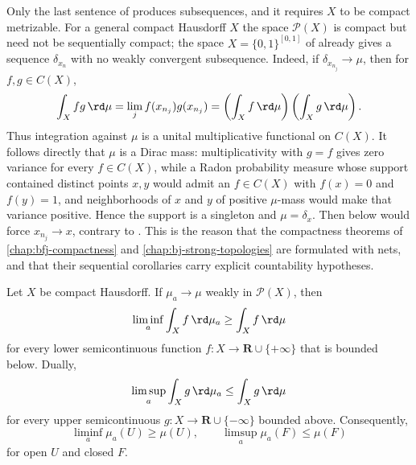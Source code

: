 \begin{remark}
\label{rem:weak-metrizability}
Only the last sentence of  produces
subsequences, and it requires $X$ to be compact metrizable.  For a general
compact Hausdorff $X$ the space $\mathcal P(X)$ is compact but need not be
sequentially compact; the space $X=\{0,1\}^{[0,1]}$ of
 already gives a sequence $\delta_{x_n}$ with no
weakly convergent subsequence.  Indeed, if
$\delta_{x_{n_j}}\to\mu$, then for $f,g\in C(X)$,
\[
 \int_Xfg\,\rd\mu
 =\lim_j f(x_{n_j})g(x_{n_j})
 =\left(\int_Xf\,\rd\mu\right)
  \left(\int_Xg\,\rd\mu\right).
\]
Thus integration against $\mu$ is a unital multiplicative functional on
$C(X)$.  It follows directly that $\mu$ is a Dirac mass: multiplicativity
with $g=f$ gives zero variance for every $f\in C(X)$, while a Radon
probability measure whose support contained distinct points $x,y$ would admit
an $f\in C(X)$ with $f(x)=0$ and $f(y)=1$, and neighborhoods of $x$ and $y$
of positive $\mu$-mass would make that variance positive.  Hence the support
is a singleton and $\mu=\delta_x$.  Then  below would force
$x_{n_j}\to x$, contrary to .  This is the reason that
the compactness theorems of \cref{chap:bfj-compactness} and
\cref{chap:bj-strong-topologies} are formulated with nets, and that their
sequential corollaries carry explicit countability hypotheses.
\end{remark}

\begin{proposition}\label{prop:portmanteau}
Let $X$ be compact Hausdorff.  If $\mu_a\to\mu$ weakly in $\mathcal P(X)$, then
\[
 \liminf_a\int_X f\,\rd \mu_a\geq\int_Xf\,\rd \mu
\]
for every lower semicontinuous function $f:X\to\mathbf R\cup\{+\infty\}$
that is bounded below.  Dually,
\[
 \limsup_a\int_X g\,\rd \mu_a\leq\int_Xg\,\rd \mu
\]
for every upper semicontinuous $g:X\to\mathbf R\cup\{-\infty\}$ bounded
above.  Consequently,
\[
 \liminf_a\mu_a(U)\geq\mu(U),\qquad
 \limsup_a\mu_a(F)\leq\mu(F)
\]
for open $U$ and closed $F$.
\end{proposition}

